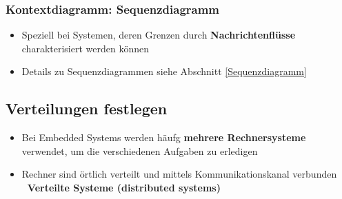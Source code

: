 \subsubsection{Kontextdiagramm: Sequenzdiagramm}

\begin{itemize}
    \item Speziell bei Systemen, deren Grenzen durch \textbf{Nachrichtenflüsse} charakterisiert werden können
    \item Details zu Sequenzdiagrammen siehe Abschnitt \ref{Sequenzdiagramm}
\end{itemize}


\subsection{Verteilungen festlegen}

\begin{itemize}
    \item Bei Embedded Systems werden häufg \textbf{mehrere Rechnersysteme} verwendet, um die verschiedenen Aufgaben zu erledigen
    \item Rechner sind örtlich verteilt und mittels Kommunikationskanal verbunden \\
        \textbf{\textrightarrow\ Verteilte Systeme (distributed systems)}
\end{itemize}

\vspace{0.2cm}

